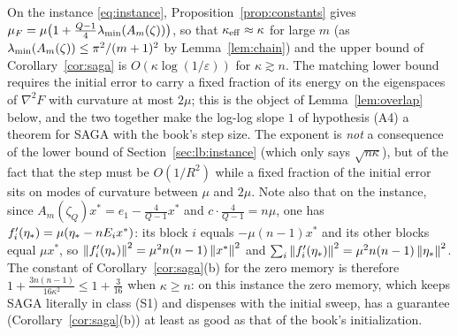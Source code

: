 On the instance \eqref{eq:instance}, Proposition~\ref{prop:constants} gives $\mu_F=\mu\big(1+\frac{Q-1}4\lambda_{\min}(A_m(\zeta))\big)$, so that $\kappa_{\rm eff}\approx\kappa$ for large $m$ (as $\lambda_{\min}(A_m(\zeta))\le\pi^2/(m+1)^2$ by Lemma~\ref{lem:chain}) and the upper bound of Corollary~\ref{cor:saga} is $O(\kappa\log(1/\varepsilon))$ for $\kappa\gtrsim n$. The matching lower bound requires the initial error to carry a fixed fraction of its energy on the eigenspaces of $\nabla^2F$ with curvature at most $2\mu$; this is the object of Lemma~\ref{lem:overlap} below, and the two together make the log-log slope $1$ of hypothesis (A4) a theorem for SAGA with the book's step size. The exponent is \emph{not} a consequence of the lower bound of Section~\ref{sec:lb:instance} (which only says $\sqrt{n\kappa}$), but of the fact that the step must be $O(1/R^2)$ while a fixed fraction of the initial error sits on modes of curvature between $\mu$ and $2\mu$. Note also that on the instance, since $A_m(\zeta_Q)x^\ast=e_1-\frac4{Q-1}x^\ast$ and $c\cdot\frac4{Q-1}=n\mu$, one has $f'_i(\eta_\ast)=\mu(\eta_\ast-nE_ix^\ast)$: its block $i$ equals $-\mu(n-1)x^\ast$ and its other blocks equal $\mu x^\ast$, so $\left\|f'_i(\eta_\ast)\right\|^2=\mu^2n(n-1)\left\|x^\ast\right\|^2$ and $\sum_i\left\|f'_i(\eta_\ast)\right\|^2=\mu^2n(n-1)\left\|\eta_\ast\right\|^2$. The constant of Corollary~\ref{cor:saga}(b) for the zero memory is therefore $1+\frac{3n(n-1)}{16\kappa^2}\le1+\frac3{16}$ when $\kappa\ge n$: on this instance the zero memory, which keeps SAGA literally in class (S1) and dispenses with the initial sweep, has a guarantee (Corollary~\ref{cor:saga}(b)) at least as good as that of the book's initialization.

